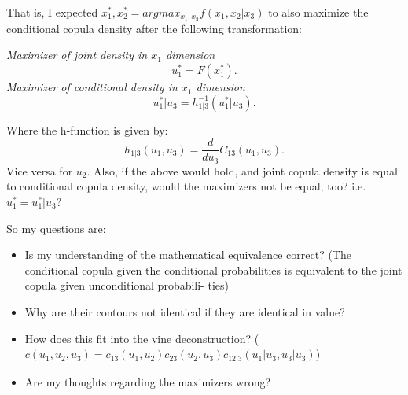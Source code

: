 \documentclass[11pt,a4paper,onecolumn,oneside]{article}
\begin{document}
That is, I expected $x_1^*, x_2^* = argmax_{x_1, x_2} f(x_1, x_2 | x_3)$ to also maximize the conditional copula density after the following transformation:

\textit{Maximizer of joint density in $x_1$ dimension}
\[
	u_1^* = F(x_1^*) 
.\] 
\textit{Maximizer of conditional density in $x_1$ dimension}
\[
	u_1^* | u_3 = h^{-1}_{1|3}(u_1^*|u_3)  .\] 

Where the h-function is given by:
\[
	h_{1|3}(u_1, u_3) = \frac{d}{du_3} C_{13}(u_1, u_3) 
.\] 
Vice versa for $u_2$. 
Also, if the above would hold, and joint copula density is equal to conditional copula density, would the maximizers not be equal, too? i.e. $u_1^* = u_1^*|u_3$?

So my questions are:
\begin{itemize}
	\item Is my understanding of the mathematical equivalence correct? (The conditional copula given the conditional
probabilities is equivalent to the joint copula given unconditional probabili-
ties)
\item Why are their contours not identical if they are identical in value? 
\item How does this fit into the vine deconstruction?  ($c(u_1, u_2, u_3) = c_{13}(u_1, u_2) c_{23}(u_2, u_3) c_{12|3}(u_1|u_3, u_3|u_3)
$)
\item Are my thoughts regarding the maximizers wrong? 
\end{itemize}
\end{document}
